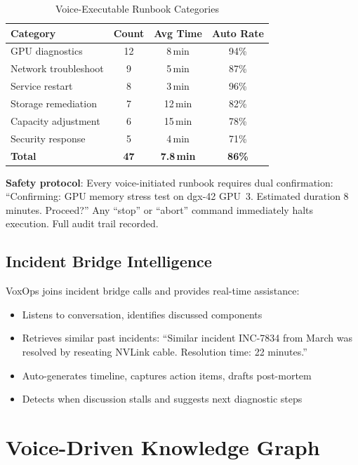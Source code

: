 \documentclass[conference,10pt]{IEEEtran}
\begin{document}
\begin{table}[!htbp]
\caption{Voice-Executable Runbook Categories}
\label{tab:runbooks}
\centering\scriptsize
\begin{tabular}{@{}lccc@{}}
\toprule
\textbf{Category} & \textbf{Count} & \textbf{Avg Time} & \textbf{Auto Rate} \\
\midrule
GPU diagnostics & 12 & 8\,min & 94\% \\
Network troubleshoot & 9 & 5\,min & 87\% \\
Service restart & 8 & 3\,min & 96\% \\
Storage remediation & 7 & 12\,min & 82\% \\
Capacity adjustment & 6 & 15\,min & 78\% \\
Security response & 5 & 4\,min & 71\% \\
\midrule
\textbf{Total} & \textbf{47} & \textbf{7.8\,min} & \textbf{86\%} \\
\bottomrule
\end{tabular}
\end{table}

\textbf{Safety protocol}: Every voice-initiated runbook requires dual confirmation: ``Confirming: GPU memory stress test on dgx-42 GPU~3. Estimated duration 8 minutes. Proceed?'' Any ``stop'' or ``abort'' command immediately halts execution. Full audit trail recorded.

\subsection{Incident Bridge Intelligence}

VoxOps joins incident bridge calls and provides real-time assistance:
\begin{itemize}
\item Listens to conversation, identifies discussed components
\item Retrieves similar past incidents: ``Similar incident INC-7834 from March was resolved by reseating NVLink cable. Resolution time: 22 minutes.''
\item Auto-generates timeline, captures action items, drafts post-mortem
\item Detects when discussion stalls and suggests next diagnostic steps
\end{itemize}

\section{Voice-Driven Knowledge Graph}
\label{sec:kg}
\end{document}
